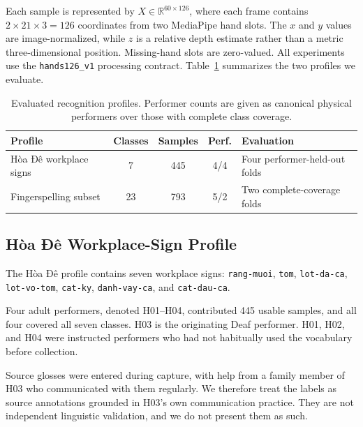 Each sample is represented by
$X\in\mathbb{R}^{60\times126}$, where each frame contains
$2\times21\times3=126$ coordinates from two MediaPipe hand slots.
The $x$ and $y$ values are image-normalized, while $z$ is a relative
depth estimate rather than a metric three-dimensional position.
Missing-hand slots are zero-valued. All experiments use the
\texttt{hands126\_v1} processing contract. Table~\ref{tab:profiles}
summarizes the two profiles we evaluate.

\begin{table}[htbp]
\centering
\caption{Evaluated recognition profiles. Performer counts are given as
canonical physical performers over those with complete class coverage.}
\label{tab:profiles}
\small
\setlength{\tabcolsep}{4pt}
\renewcommand{\arraystretch}{1.08}

\begin{tabularx}{\linewidth}{
    >{\raggedright\arraybackslash}p{3.7cm}
    c
    c
    c
    >{\raggedright\arraybackslash}X
}
\toprule
\textbf{Profile}
& \textbf{Classes}
& \textbf{Samples}
& \textbf{Perf.}
& \textbf{Evaluation} \\
\midrule
Hòa Đê workplace signs
& 7 & 445 & 4/4
& Four performer-held-out folds \\
Fingerspelling subset
& 23 & 793 & 5/2
& Two complete-coverage folds \\
\bottomrule
\end{tabularx}
\end{table}

\subsection{Hòa Đê Workplace-Sign Profile}
\label{subsec:hoa_de_profile}

The Hòa Đê profile contains seven workplace signs:
\texttt{rang-muoi}, \texttt{tom}, \texttt{lot-da-ca},
\texttt{lot-vo-tom}, \texttt{cat-ky}, \texttt{danh-vay-ca}, and
\texttt{cat-dau-ca}.

Four adult performers, denoted H01--H04, contributed 445 usable samples,
and all four covered all seven classes. H03 is the originating Deaf
performer. H01, H02, and H04 were instructed performers who had not
habitually used the vocabulary before collection.

Source glosses were entered during capture, with help from a family
member of H03 who communicated with them regularly. We therefore treat
the labels as source annotations grounded in H03's own communication
practice. They are not independent linguistic validation, and we do not
present them as such.

